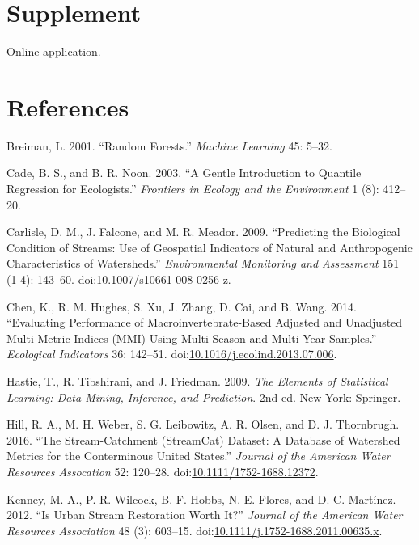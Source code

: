 \documentclass[]{article}
\begin{document}
\section{Supplement}\label{supplement}

Online application.

\section*{References}\label{references}

\hypertarget{refs}{}
\hypertarget{ref-Breiman01}{}
Breiman, L. 2001. ``Random Forests.'' \emph{Machine Learning} 45: 5--32.

\hypertarget{ref-Cade03}{}
Cade, B. S., and B. R. Noon. 2003. ``A Gentle Introduction to Quantile
Regression for Ecologists.'' \emph{Frontiers in Ecology and the
Environment} 1 (8): 412--20.

\hypertarget{ref-Carlisle09}{}
Carlisle, D. M., J. Falcone, and M. R. Meador. 2009. ``Predicting the
Biological Condition of Streams: Use of Geospatial Indicators of Natural
and Anthropogenic Characteristics of Watersheds.'' \emph{Environmental
Monitoring and Assessment} 151 (1-4): 143--60.
doi:\href{https://doi.org/10.1007/s10661-008-0256-z}{10.1007/s10661-008-0256-z}.

\hypertarget{ref-Chen14}{}
Chen, K., R. M. Hughes, S. Xu, J. Zhang, D. Cai, and B. Wang. 2014.
``Evaluating Performance of Macroinvertebrate-Based Adjusted and
Unadjusted Multi-Metric Indices (MMI) Using Multi-Season and Multi-Year
Samples.'' \emph{Ecological Indicators} 36: 142--51.
doi:\href{https://doi.org/10.1016/j.ecolind.2013.07.006}{10.1016/j.ecolind.2013.07.006}.

\hypertarget{ref-Hastie09}{}
Hastie, T., R. Tibshirani, and J. Friedman. 2009. \emph{The Elements of
Statistical Learning: Data Mining, Inference, and Prediction}. 2nd ed.
New York: Springer.

\hypertarget{ref-Hill16}{}
Hill, R. A., M. H. Weber, S. G. Leibowitz, A. R. Olsen, and D. J.
Thornbrugh. 2016. ``The Stream-Catchment (StreamCat) Dataset: A Database
of Watershed Metrics for the Conterminous United States.'' \emph{Journal
of the American Water Resources Assocation} 52: 120--28.
doi:\href{https://doi.org/10.1111/1752-1688.12372}{10.1111/1752-1688.12372}.

\hypertarget{ref-Kenney12}{}
Kenney, M. A., P. R. Wilcock, B. F. Hobbs, N. E. Flores, and D. C.
Martínez. 2012. ``Is Urban Stream Restoration Worth It?'' \emph{Journal
of the American Water Resources Association} 48 (3): 603--15.
doi:\href{https://doi.org/10.1111/j.1752-1688.2011.00635.x}{10.1111/j.1752-1688.2011.00635.x}.
\end{document}
